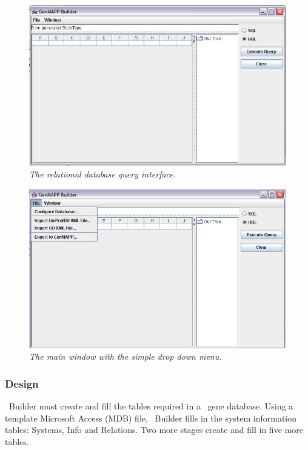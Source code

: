 \begin{figure}[htp]
\centering
\includegraphics[scale=0.75]{Images/query.jpg}
\caption{\small \sl The relational database query interface.}
\end{figure}

\begin{figure}[htp]
\centering
\includegraphics[scale=0.75]{Images/exportGenmapp.jpg}
\caption{\small \sl The main window with the simple drop down menu.}
\end{figure}


\subsubsection{Design}
\genmapp~Builder must create and fill the tables required in a \genmapp~gene database.  Using a template Microsoft Access (MDB) file, \genmapp~Builder fills in the system information tables: Systems, Info and Relations.  Two more stages create and fill in five more tables.

